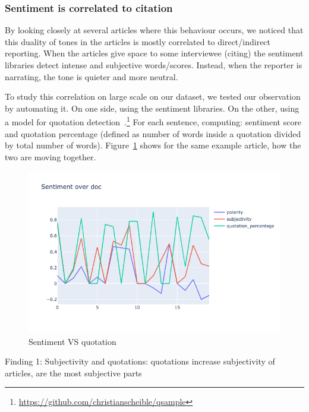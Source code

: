 \subsubsection{Sentiment is correlated to citation}
By looking closely at several articles where this behaviour occurs, we noticed that this duality of tones in the articles is mostly correlated to direct/indirect reporting. When the articles give space to some interviewee (citing) the sentiment libraries detect intense and subjective words/scores. Instead, when the reporter is narrating, the tone is quieter and more neutral.

To study this correlation on large scale on our dataset, we tested our observation by automating it.
On one side, using the sentiment libraries. On the other, using a model for quotation detection~\citep{scheible2016model}.\footnote{\url{https://github.com/christianscheible/qsample}}
For each sentence, computing: sentiment score and quotation percentage (defined as number of words inside a quotation divided by total number of words).
Figure~\ref{fig:sentiment_vs_quotation} shows for the same example article, how the two are moving together.

\begin{figure}[!htbp]
    \centering
    \includegraphics[width=\linewidth]{figures/sentiment_vs_quotation.png}
    \caption{Sentiment VS quotation}
    \label{fig:sentiment_vs_quotation}
\end{figure}


Finding 1:
Subjectivity and quotations: quotations increase subjectivity of articles, are the most subjective parts

